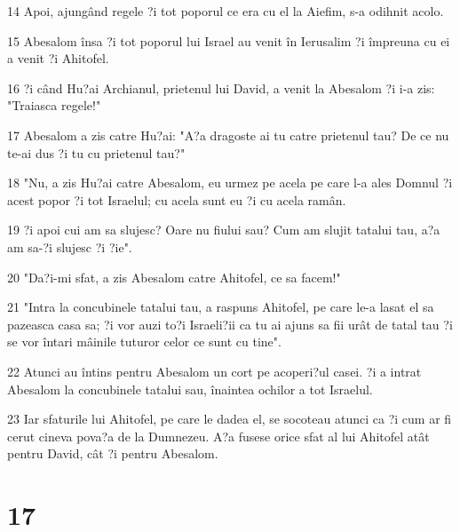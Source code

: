 \par 14 Apoi, ajungând regele ?i tot poporul ce era cu el la Aiefim, s-a odihnit acolo.
\par 15 Abesalom însa ?i tot poporul lui Israel au venit în Ierusalim ?i împreuna cu ei a venit ?i Ahitofel.
\par 16 ?i când Hu?ai Archianul, prietenul lui David, a venit la Abesalom ?i i-a zis: "Traiasca regele!"
\par 17 Abesalom a zis catre Hu?ai: "A?a dragoste ai tu catre prietenul tau? De ce nu te-ai dus ?i tu cu prietenul tau?"
\par 18 "Nu, a zis Hu?ai catre Abesalom, eu urmez pe acela pe care l-a ales Domnul ?i acest popor ?i tot Israelul; cu acela sunt eu ?i cu acela ramân.
\par 19 ?i apoi cui am sa slujesc? Oare nu fiului sau? Cum am slujit tatalui tau, a?a am sa-?i slujesc ?i ?ie".
\par 20 "Da?i-mi sfat, a zis Abesalom catre Ahitofel, ce sa facem!"
\par 21 "Intra la concubinele tatalui tau, a raspuns Ahitofel, pe care le-a lasat el sa pazeasca casa sa; ?i vor auzi to?i Israeli?ii ca tu ai ajuns sa fii urât de tatal tau ?i se vor întari mâinile tuturor celor ce sunt cu tine".
\par 22 Atunci au întins pentru Abesalom un cort pe acoperi?ul casei. ?i a intrat Abesalom la concubinele tatalui sau, înaintea ochilor a tot Israelul.
\par 23 Iar sfaturile lui Ahitofel, pe care le dadea el, se socoteau atunci ca ?i cum ar fi cerut cineva pova?a de la Dumnezeu. A?a fusese orice sfat al lui Ahitofel atât pentru David, cât ?i pentru Abesalom.

\chapter{17}

